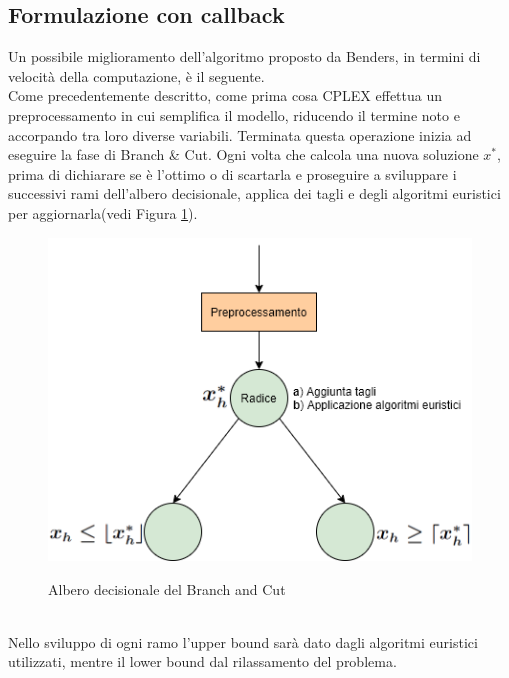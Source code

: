 \subsection{Formulazione con callback}
Un possibile miglioramento dell'algoritmo proposto da Benders, in termini di velocità della computazione, è il seguente.\\
Come precedentemente descritto, come prima cosa CPLEX effettua un preprocessamento in cui semplifica il modello, riducendo il termine noto e accorpando tra loro diverse variabili. Terminata questa operazione inizia ad eseguire la fase di Branch \& Cut. Ogni volta che calcola una nuova soluzione $x^*$, prima di dichiarare se è l'ottimo o di scartarla e proseguire a sviluppare i successivi rami dell'albero decisionale, applica dei tagli e degli algoritmi euristici per aggiornarla(vedi Figura \ref{Albero_decisionale}).
\begin{figure}[h] 
\begin{center} 
  \includegraphics[scale=0.7]{Images/albero_decisionale}\\ 
  \caption{\footnotesize{Albero decisionale del Branch and Cut}}
  \label{Albero_decisionale} 
\end{center} 
\end{figure}
\\Nello sviluppo di ogni ramo l'upper bound sarà dato dagli algoritmi euristici utilizzati, mentre il lower bound dal rilassamento del problema.\\ 
